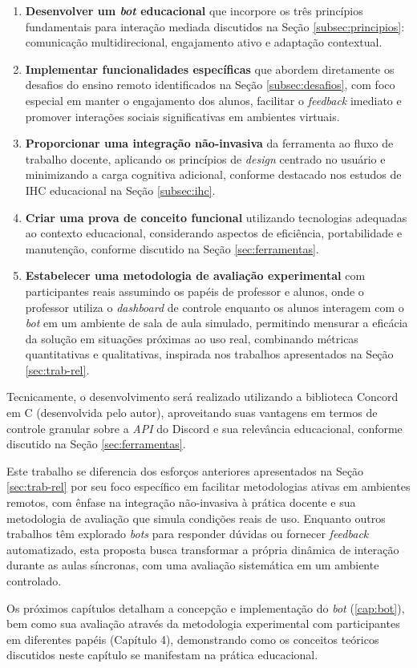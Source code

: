 \begin{enumerate}
\item \textbf{Desenvolver um \textit{bot} educacional} que incorpore os três
princípios fundamentais para interação mediada discutidos na Seção
\ref{subsec:principios}: comunicação multidirecional, engajamento ativo e
adaptação contextual.
\item \textbf{Implementar funcionalidades específicas} que abordem diretamente
os desafios do ensino remoto identificados na Seção \ref{subsec:desafios}, com
foco especial em manter o engajamento dos alunos, facilitar o \textit{feedback}
imediato e promover interações sociais significativas em ambientes virtuais.
\item \textbf{Proporcionar uma integração não-invasiva} da ferramenta ao fluxo
de trabalho docente, aplicando os princípios de \textit{design} centrado no
usuário e minimizando a carga cognitiva adicional, conforme destacado nos
estudos de IHC educacional na Seção \ref{subsec:ihc}.
\item \textbf{Criar uma prova de conceito funcional} utilizando tecnologias
adequadas ao contexto educacional, considerando aspectos de eficiência,
portabilidade e manutenção, conforme discutido na Seção \ref{sec:ferramentas}.
\item \textbf{Estabelecer uma metodologia de avaliação experimental} com
participantes reais assumindo os papéis de professor e alunos, onde o professor
utiliza o \textit{dashboard} de controle enquanto os alunos interagem com o
\textit{bot} em um ambiente de sala de aula simulado, permitindo mensurar a
eficácia da solução em situações próximas ao uso real, combinando métricas
quantitativas e qualitativas, inspirada nos trabalhos apresentados na Seção
\ref{sec:trab-rel}.
\end{enumerate}

Tecnicamente, o desenvolvimento será realizado utilizando a biblioteca Concord
em C (desenvolvida pelo autor), aproveitando suas vantagens em termos de
controle granular sobre a \textit{API} do Discord e sua relevância educacional,
conforme discutido na Seção \ref{sec:ferramentas}.

Este trabalho se diferencia dos esforços anteriores apresentados na Seção
\ref{sec:trab-rel} por seu foco específico em facilitar metodologias ativas em
ambientes remotos, com ênfase na integração não-invasiva à prática docente e sua
metodologia de avaliação que simula condições reais de uso. Enquanto outros
trabalhos têm explorado \textit{bots} para responder dúvidas ou fornecer
\textit{feedback} automatizado, esta proposta busca transformar a própria
dinâmica de interação durante as aulas síncronas, com uma avaliação sistemática
em um ambiente controlado.

Os próximos capítulos detalham a concepção e implementação do \textit{bot} 
(\ref{cap:bot}), bem como sua avaliação através da metodologia experimental com
participantes em diferentes papéis (Capítulo 4), demonstrando como os conceitos
teóricos discutidos neste capítulo se manifestam na prática educacional.
